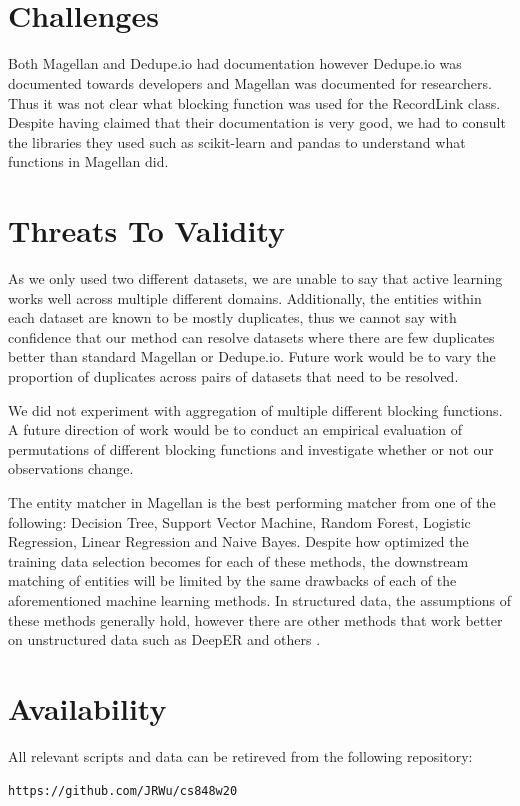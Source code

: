 \documentclass[letterpaper,twocolumn,10pt]{article}
\begin{document}
\noindent{}
\\\\

\section{Challenges}
Both Magellan and Dedupe.io had documentation however Dedupe.io was documented towards developers and Magellan was documented for researchers. Thus it was not clear what blocking function was used for the RecordLink class. Despite having claimed that their documentation is very good, we had to consult the libraries they used such as scikit-learn and pandas to understand what functions in Magellan did. 


\section{Threats To Validity}
As we only used two different datasets, we are unable to say that active learning works well across multiple different domains. Additionally, the entities within each dataset are known to be mostly duplicates, thus we cannot say with confidence that our method can resolve datasets where there are few duplicates better than standard Magellan or Dedupe.io. Future work would be to vary the proportion of duplicates across pairs of datasets that need to be resolved. 

We did not experiment with aggregation of multiple different blocking functions. A future direction of work would be to conduct an empirical evaluation of permutations of different blocking functions and investigate whether or not our observations change. 

The entity matcher in Magellan is the best performing matcher from one of the following: Decision Tree, Support Vector Machine, Random Forest, Logistic Regression, Linear Regression and Naive Bayes. Despite how optimized the training data selection becomes for each of these methods, the downstream matching of entities will be limited by the same drawbacks of each of the aforementioned machine learning methods. In structured data, the assumptions of these methods generally hold, however there are other methods that work better on unstructured data such as DeepER and others \cite{ebraheem2017deeper, mudgal2018deep}.

\section{Availability}\label{Availability}
All relevant scripts and data can be retireved from the following repository:
\begin{center}
{\tt https://github.com/JRWu/cs848w20}
\end{center}



{\footnotesize 


\newpage
}
\end{document}
